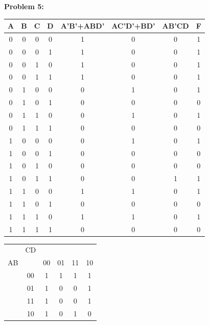 \documentclass{article}
\begin{document}

    \textbf{Problem 5:}

    \begin{center}
        \begin{tabular} {ccccccc|c}
            A & B & C & D & A'B'+ABD' & AC'D'+BD' & AB'CD & F \\
            \hline
            0 & 0 & 0 & 0 & 1& 0& 0& 1 \\
            0 & 0 & 0 & 1 & 1& 0& 0& 1 \\
            0 & 0 & 1 & 0 & 1& 0& 0& 1 \\
            0 & 0 & 1 & 1 & 1& 0& 0& 1 \\
            0 & 1 & 0 & 0 & 0& 1& 0& 1 \\
            0 & 1 & 0 & 1 & 0& 0& 0& 0 \\
            0 & 1 & 1 & 0 & 0& 1& 0& 1 \\
            0 & 1 & 1 & 1 & 0& 0& 0& 0 \\
            1 & 0 & 0 & 0 & 0& 1& 0& 1 \\
            1 & 0 & 0 & 1 & 0& 0& 0& 0 \\
            1 & 0 & 1 & 0 & 0& 0& 0& 0 \\
            1 & 0 & 1 & 1 & 0& 0& 1& 1 \\
            1 & 1 & 0 & 0 & 1& 1& 0& 1 \\
            1 & 1 & 0 & 1 & 0& 0& 0& 0 \\
            1 & 1 & 1 & 0 & 1& 1& 0& 1 \\
            1 & 1 & 1 & 1 & 0& 0& 0& 0 \\
        \end{tabular}
    \end{center}

    \begin{center}
        \begin{tabular} {cc|cccc}
            & CD & &&& \\
            AB && 00 & 01 & 11 & 10 \\
            \hline
            & 00 & 1 & 1 & 1 & 1 \\
            & 01 & 1 & 0 & 0 & 1 \\
            & 11 & 1 & 0 & 0 & 1 \\
            & 10 & 1 & 0 & 1 & 0 \\
        \end{tabular}
    \end{center}
    
\end{document}
